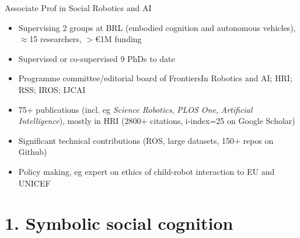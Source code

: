 \documentclass[xcolor=table]{beamer}
\begin{document}
\begin{frame}{Associate Prof in Social Robotics and AI}
    \begin{itemize}
        \item Supervising 2 groups at BRL (embodied cognition and autonomous
            vehicles), $\approx$15 researchers, $>$€1M funding
        \item Supervised or co-supervised 9 PhDs to date
        \item Programme committee/editorial board of FrontiersIn Robotics and
            AI; HRI; RSS; IROS; IJCAI
        \item 75+ publications (incl. eg \emph{Science Robotics}, \emph{PLOS One},
            \emph{Artificial Intelligence}), mostly in HRI (2800+ citations, i-index=25 on Google Scholar)
        \item Significant technical contributions (ROS, large datasets, 150+
            repos on Github)
        \item Policy making, eg expert on ethics of child-robot interaction to EU and UNICEF
    \end{itemize}

\end{frame}







\section{1. Symbolic social cognition}
\end{document}
